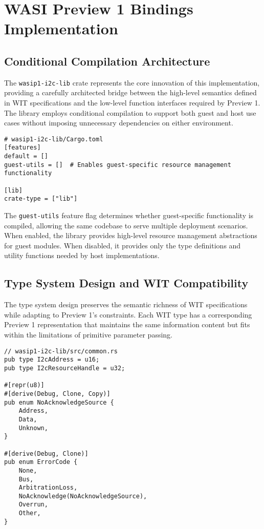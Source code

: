 \section{WASI Preview 1 Bindings Implementation}
\label{sec:wasip1-bindings}

\subsection{Conditional Compilation Architecture}

The \texttt{wasip1-i2c-lib} crate represents the core innovation of this implementation, providing a carefully architected bridge between the high-level semantics defined in WIT specifications and the low-level function interfaces required by Preview 1. The library employs conditional compilation to support both guest and host use cases without imposing unnecessary dependencies on either environment.

\begin{verbatim}
# wasip1-i2c-lib/Cargo.toml
[features]
default = []
guest-utils = []  # Enables guest-specific resource management functionality

[lib]
crate-type = ["lib"]
\end{verbatim}

The \texttt{guest-utils} feature flag determines whether guest-specific functionality is compiled, allowing the same codebase to serve multiple deployment scenarios. When enabled, the library provides high-level resource management abstractions for guest modules. When disabled, it provides only the type definitions and utility functions needed by host implementations.

\subsection{Type System Design and WIT Compatibility}

The type system design preserves the semantic richness of WIT specifications while adapting to Preview 1's constraints. Each WIT type has a corresponding Preview 1 representation that maintains the same information content but fits within the limitations of primitive parameter passing.

\begin{verbatim}
// wasip1-i2c-lib/src/common.rs
pub type I2cAddress = u16;
pub type I2cResourceHandle = u32;

#[repr(u8)]
#[derive(Debug, Clone, Copy)]
pub enum NoAcknowledgeSource {
    Address,
    Data,
    Unknown,
}

#[derive(Debug, Clone)]
pub enum ErrorCode {
    None,
    Bus,
    ArbitrationLoss,
    NoAcknowledge(NoAcknowledgeSource),
    Overrun,
    Other,
}
\end{verbatim}

